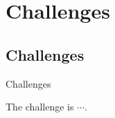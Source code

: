 \section{Challenges}\label{sec:challenges}

\subsection{Challenges}\label{subsec:challenges}

\begin{frame}{Challenges}

    The challenge is $\cdots$.

\end{frame}

